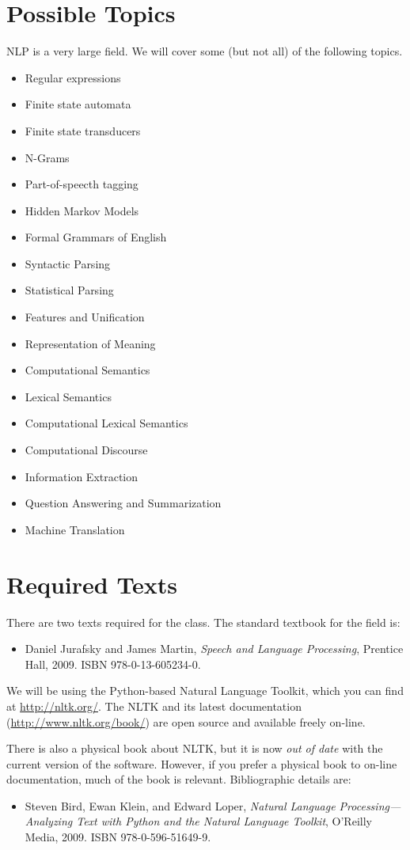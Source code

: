 \documentclass{article}
\begin{document}
\section{Possible Topics}
\label{sec-4}
NLP is a very large field. We will cover some (but not all) of the following topics.
\begin{itemize}
\item Regular expressions
\item Finite state automata
\item Finite state transducers
\item N-Grams
\item Part-of-speecth tagging
\item Hidden Markov Models
\item Formal Grammars of English
\item Syntactic Parsing
\item Statistical Parsing
\item Features and Unification
\item Representation of Meaning
\item Computational Semantics
\item Lexical Semantics
\item Computational Lexical Semantics
\item Computational Discourse
\item Information Extraction
\item Question Answering and Summarization
\item Machine Translation
\end{itemize}
\section{Required Texts}
\label{sec-5}
There are two texts required for the class. The standard textbook for the field is:
\begin{itemize}
\item Daniel Jurafsky and James Martin,
\emph{Speech and Language Processing}, Prentice Hall, 2009. ISBN 978-0-13-605234-0.
\end{itemize}
We will be using the Python-based Natural Language Toolkit,
which you can find at \url{http://nltk.org/}.
The NLTK and its latest documentation (\url{http://www.nltk.org/book/})
are open source and available freely on-line.

There is also a physical book about NLTK,
but it is now \emph{out of date} with the current version of the software.
However, if you prefer a physical book to on-line documentation,
much of the book is relevant.
Bibliographic details are:
\begin{itemize}
\item Steven Bird, Ewan Klein, and Edward Loper,
\emph{Natural Language Processing—Analyzing Text with Python and the Natural Language Toolkit},
O’Reilly Media, 2009. ISBN 978-0-596-51649-9.
\end{itemize}
\end{document}
